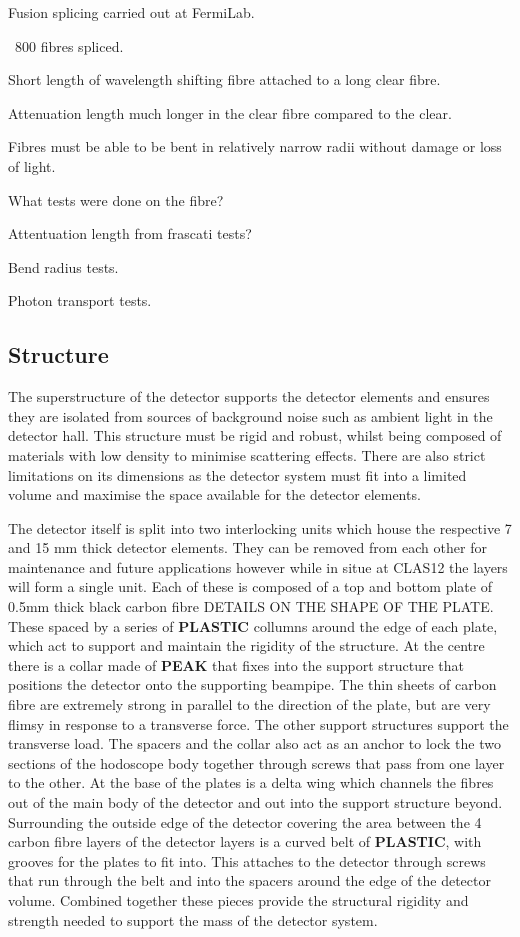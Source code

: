 Fusion splicing carried out at FermiLab.

~800 fibres spliced.

Short length of wavelength shifting fibre attached to a long clear fibre.

Attenuation length much longer in the clear fibre compared to the clear.

Fibres must be able to be bent in relatively narrow radii without damage or loss of light. 

What tests were done on the fibre?

Attentuation length from frascati tests?

Bend radius tests.

Photon transport tests.

\cite{dyshkant2006quality}
\subsection{Structure}

The superstructure of the detector supports the detector elements and ensures they are isolated from sources of background noise such as ambient light in the detector hall. This structure must be rigid and robust, whilst being composed of materials with low density to minimise scattering effects. There are also strict limitations on its dimensions as the detector system must fit into a limited volume and maximise the space available for the detector elements.

The detector itself is split into two interlocking units which house the respective 7 and 15 mm thick detector elements. They can be removed from each other for maintenance and future applications however while in situe at CLAS12 the layers will form a single unit. Each of these is composed of a top and bottom plate of 0.5mm thick black carbon fibre DETAILS ON THE SHAPE OF THE PLATE. These spaced by a series of \textbf{PLASTIC} collumns around the edge of each plate, which act to support and maintain the rigidity of the structure. At the centre there is a collar made of \textbf{PEAK} that fixes into the support structure that positions the detector onto the supporting beampipe. The thin sheets of carbon fibre are extremely strong in parallel to the direction of the plate, but are very flimsy in response to a transverse force. The other support structures support the transverse load. The spacers and the collar also act as an anchor to lock the two sections of the hodoscope body together through screws that pass from one layer to the other. At the base of the plates is a delta wing which channels the fibres out of the main body of the detector and out into the support structure beyond. Surrounding the outside edge of the detector covering the area between the 4 carbon fibre layers of the detector layers is a curved belt of \textbf{PLASTIC}, with grooves for the plates to fit into. This attaches to the detector through screws that run through the belt and into the spacers around the edge of the detector volume. Combined together these pieces provide the structural rigidity and strength needed to support the mass of the detector system.

